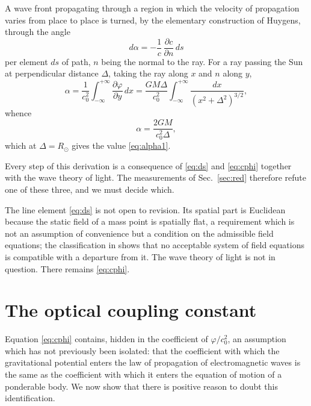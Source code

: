 \documentclass[aps,prd,reprint,amsmath,amssymb,nofootinbib,longbibliography]{revtex4-2}
\begin{document}
A wave front propagating through a region in which the velocity of propagation varies from place to
place is turned, by the elementary construction of Huygens, through the angle
\begin{equation}
d\alpha = -\frac{1}{c}\,\frac{\partial c}{\partial n}\, ds
\end{equation}
per element $ds$ of path, $n$ being the normal to the ray. For a ray passing the Sun at
perpendicular distance $\Delta$, taking the ray along $x$ and $n$ along $y$,
\begin{equation}
\alpha = \frac{1}{c_0^{2}} \int_{-\infty}^{+\infty} \frac{\partial \varphi}{\partial y}\, dx
       = \frac{GM\Delta}{c_0^{2}} \int_{-\infty}^{+\infty} \frac{dx}{(x^{2}+\Delta^{2})^{3/2}} ,
\end{equation}
whence
\begin{equation}
\alpha = \frac{2GM}{c_0^{2}\Delta} ,
\label{eq:alphaD}
\end{equation}
which at $\Delta = R_\odot$ gives the value \eqref{eq:alpha1}.

Every step of this derivation is a consequence of \eqref{eq:ds} and \eqref{eq:cphi} together with
the wave theory of light. The measurements of Sec.~\ref{sec:red} therefore refute one of these
three, and we must decide which.

The line element \eqref{eq:ds} is not open to revision. Its spatial part is Euclidean because the
static field of a mass point is spatially flat, a requirement which is not an assumption of
convenience but a condition on the admissible field equations; the classification in \cite{paperD}
shows that no acceptable system of field equations is compatible with a departure from it. The wave
theory of light is not in question. There remains \eqref{eq:cphi}.

\section{The optical coupling constant}
\label{sec:gamma}

Equation \eqref{eq:cphi} contains, hidden in the coefficient of $\varphi/c_0^{2}$, an assumption
which has not previously been isolated: that the coefficient with which the gravitational potential
enters the law of propagation of electromagnetic waves is the same as the coefficient with which it
enters the equation of motion of a ponderable body. We now show that there is positive reason to
doubt this identification.
\end{document}
